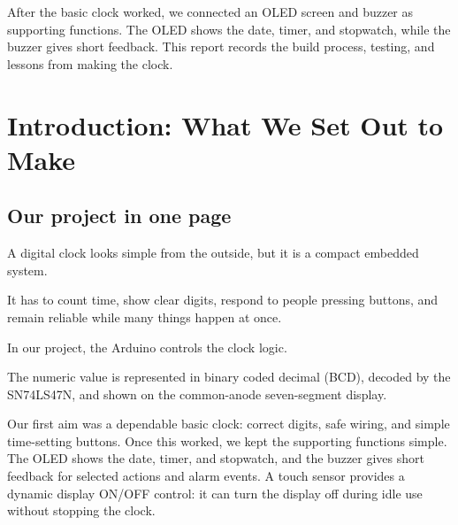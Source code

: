 \documentclass[12pt,letterpaper]{article}
\begin{document}
After the basic clock worked, we connected an OLED screen
and buzzer as supporting functions. The OLED shows the date,
timer, and stopwatch, while the buzzer gives short feedback.
This report records the build process, testing, and lessons
from making the clock.

\clearpage

\tableofcontents

\clearpage

\listoftables
{}

\listoffigures
{}

\clearpage

\setcounter{page}{1}


\section{Introduction: What We Set Out to Make}

\subsection{Our project in one page}

A digital clock looks simple from the outside,
but it is a compact embedded system.

It has to count time, show clear digits,
respond to people pressing buttons,
and remain reliable while many things happen at once.

In our project, the Arduino controls the clock logic.

The numeric value is represented in
binary coded decimal (BCD),
decoded by the SN74LS47N,
and shown on the common-anode
seven-segment display.

Our first aim was a dependable basic clock: correct digits,
safe wiring, and simple time-setting buttons. Once this
worked, we kept the supporting functions simple. The OLED
shows the date, timer, and stopwatch, and the buzzer gives
short feedback for selected actions and alarm events. A touch
sensor provides a dynamic display ON/OFF control: it can turn
the display off during idle use without stopping the clock.
\end{document}
